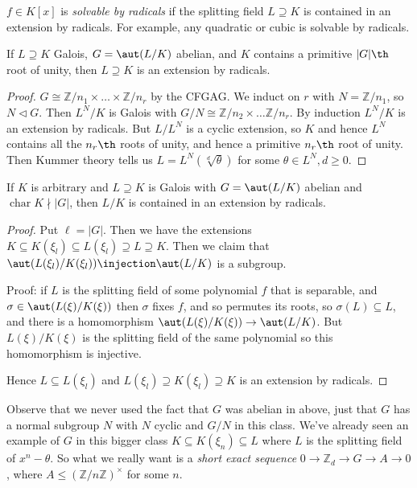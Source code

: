 \documentclass[a4paper, 10pt, twocolumn]{amsart}
\renewcommand{\charr}{\operatorname{char}}
\begin{document}
$f \in K[x]$ is \emph{solvable by radicals} if the splitting field $L \supseteq K$ is contained in an extension by radicals. For example, any quadratic or cubic is solvable by radicals.

\begin{lemma}
If $L \supseteq K$ Galois, $G = \aut(L/K)$ abelian, and $K$ contains a primitive $|G|\th$ root of unity, then $L \supseteq K$ is an extension by radicals.
\end{lemma}
\begin{proof}
$G \cong \mathbb{Z}/n_1 \times \ldots \times \mathbb{Z}/n_r$ by the CFGAG. We induct on $r$ with $N = \mathbb{Z}/n_1$, so $N \triangleleft G$. Then $L^N/K$ is Galois with $G/N \cong \mathbb{Z}/n_2 \times \ldots \mathbb{Z}/n_r$. By induction $L^N/K$ is an extension by radicals. But $L/L^N$ is a cyclic extension, so $K$ and hence $L^N$ contains all the $n_r\th$ roots of unity, and hence a primitive $n_r\th$ root of unity. Then Kummer theory tells us $L = L^N(\sqrt[d]{\theta})$ for some $\theta \in L^N, d \geq 0$.
\end{proof}

\begin{corollary}
If $K$ is arbitrary and $L \supseteq K$ is Galois with $G = \aut(L/K)$ abelian and $\charr K \nmid |G|$, then $L/K$ is contained in an extension by radicals.
\end{corollary}
\begin{proof}
Put $\ell = |G|$. Then we have the extensions $K \subseteq K(\xi_l) \subseteq L(\xi_l) \supseteq L \supseteq K$. Then we claim that $\aut(L(\xi_l)/K(\xi_l)) \injection \aut(L/K)$ is a subgroup.

Proof: if $L$ is the splitting field of some polynomial $f$ that is separable, and $\sigma \in \aut(L(\xi)/K(\xi))$ then $\sigma$ fixes $f$, and so permutes its roots, so $\sigma(L)\subseteq L$, and there is a homomorphism $\aut(L(\xi)/K(\xi)) \to \aut(L/K)$. But $L(\xi)/K(\xi)$ is the splitting field of the same polynomial so this homomorphism is injective.

Hence $L \subseteq L(\xi_l)$ and $L(\xi_l) \supseteq K(\xi_l) \supseteq K$ is an extension by radicals.
\end{proof}
Observe that we never used the fact that $G$ was abelian in above, just that $G$ has a normal subgroup $N$ with $N$ cyclic and $G/N$ in this class. We've already seen an example of $G$ in this bigger class $K \subseteq K(\xi_n) \subseteq L$ where $L$ is the splitting field of $x^n-\theta$. So what we really want is a \emph{short exact sequence} $0 \to \mathbb{Z}_d \to G \to A \to 0$, where $A \leq (\mathbb{Z}/n\mathbb{Z})^{\times}$ for some $n$.
\end{document}
